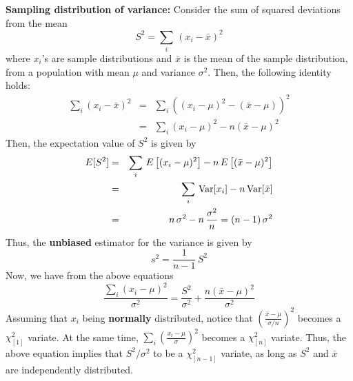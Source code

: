 \documentclass[aps,prl,preprint,superscriptaddress]{revtex4-1}
\begin{document}
\vspace{0.5cm}
{\bf Sampling distribution of variance:} Consider the sum of squared deviations from the mean
%
\begin{equation}
S^2 = \sum_i\, \left( x_i - \bar{x} \right)^2
\end{equation}
%
where $x_i$'s are sample distributions and $\bar{x}$ is the mean of the sample distribution,
from a population with mean $\mu$ and variance $\sigma^2$. Then, 
the following identity holds:
%
\begin{eqnarray}
\sum_i \left(x_i - \bar{x}\right)^2 &=& \sum_i \left( (x_i - \mu)^2 - (\bar{x}-\mu) \right)^2 \nonumber\\
 &=& \sum_i \left(x_i - \mu\right)^2 - n(\bar{x}-\mu)^2
\end{eqnarray}
%
Then, the expectation value of $S^2$ is given by
%
\begin{eqnarray}
E[S^2] &=& \sum_i\, E\left[ (x_i - \mu)^2 \right] - n\, E\left[ (\bar{x}-\mu)^2\right] \nonumber\\
       &=& \sum_i\, {\rm Var}[x_i] - n\, {\rm Var}[\bar{x}] \nonumber\\
       &=& n\, \sigma^2 - n\, \frac{\sigma^2}{n} = (n-1)\, \sigma^2
\end{eqnarray}
%
Thus, the {\bf unbiased} estimator for the variance is given by
%
\begin{equation}
s^2 = \frac{1}{n-1}\, S^2
\end{equation}
%
Now, we have from the above equations
%
\begin{equation}
\frac{\sum_i ( x_i - \mu)^2}{\sigma^2} = \frac{S^2}{\sigma^2} + \frac{n (\bar{x}-\mu)^2}{\sigma^2}
\end{equation}
%
Assuming that $x_i$ being {\bf normally} distributed, notice that $\left( \frac{\bar{x}-\mu}{\sigma/n} \right)^2$ 
becomes a $\chi^2_{[1]}$ variate. At the same time, $\sum_i \left( \frac{x_i-\mu}{\sigma} \right)^2$ becomes a
$\chi^2_{[n]}$ variate. Thus, the above equation implies that $S^2/\sigma^2$ to be a $\chi^2_{[n-1]}$ variate,
as long as $S^2$ and $\bar{x}$ are independently distributed.
\end{document}
